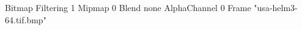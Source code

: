 {Bitmap
	{Filtering 1}
	{Mipmap 0}
	{Blend none}
	{AlphaChannel 0}
	{Frame "usa-helm3-64.tif.bmp"}
}
